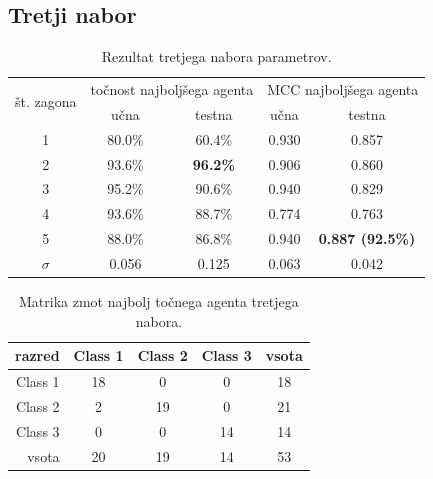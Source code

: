 \subsection{Tretji nabor}\label{subsec:dodatek-wine-tretji-nabor}
\begin{table}[H]
    \begin{center}
        \begin{tabular}{|| c | c c || c c ||}
            \hline
            \multirow{2}{*}{št. zagona} & \multicolumn{2}{c||}{točnost najboljšega agenta} & \multicolumn{2}{c||}{MCC najboljšega agenta} \\ \cline{2-5}
            & učna   & testna          & učna  & testna                  \\
            \hline
            1        & 80.0\% & 60.4\%          & 0.930 & 0.857                   \\
            \hline
            2        & 93.6\% & \textbf{96.2\%} & 0.906 & 0.860                   \\
            \hline
            3        & 95.2\% & 90.6\%          & 0.940 & 0.829                   \\
            \hline
            4        & 93.6\% & 88.7\%          & 0.774 & 0.763                   \\
            \hline
            5        & 88.0\% & 86.8\%          & 0.940 & \textbf{0.887 (92.5\%)} \\
            \hline
            $\sigma$ & 0.056  & 0.125           & 0.063 & 0.042                   \\
            \hline
        \end{tabular}
    \end{center}
    \caption{Rezultat tretjega nabora parametrov.}
    \label{tab:wine_result_3}
\end{table}

\begin{table}[H]
    \centering
    \begin{tabular}{||rcccc||}
        \hline
        razred  & Class 1 & Class 2 & Class 3 & vsota \\ \hline
        Class 1 & 18      & 0       & 0       & 18    \\ \hline
        Class 2 & 2       & 19      & 0       & 21    \\ \hline
        Class 3 & 0       & 0       & 14      & 14    \\ \hline
        vsota   & 20      & 19      & 14      & 53    \\ \hline
    \end{tabular}
    \caption{Matrika zmot najbolj točnega agenta tretjega nabora.}
    \label{tab:wine_acc_3}
\end{table}

